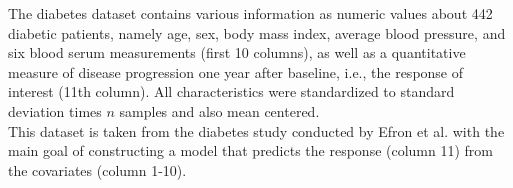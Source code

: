The diabetes dataset contains various information as numeric values about 442 diabetic patients, namely age, sex, body mass index, average blood pressure, and six blood serum measurements (first 10 columns), as well as a quantitative measure of disease progression one year after baseline, i.e., the response of interest (11th column). All characteristics were standardized to standard deviation times $n$ samples and also mean centered.\\
This dataset is taken from the diabetes study conducted by Efron et al. \cite{diabetes} with the main goal of constructing a model that predicts the response (column 11) from the covariates (column 1-10).